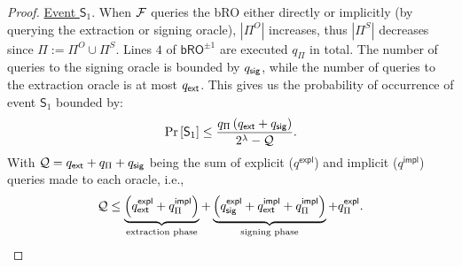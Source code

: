 \documentclass[version=submission, floatrow]{iacrcc}
\begin{document}
\begin{proof}
    \noindent\underline{Event $\mathsf{S}_{1}$}. When $\mathcal{F}$ queries the \textsf{bRO} either directly or implicitly (by querying the extraction or signing oracle), $|\Pi^{O}|$ increases, thus $|\Pi^{S}|$ decreases since $\Pi := \Pi^{O} \cup\Pi^{S}$. Lines $4$ of $\mathsf{bRO}^{\pm1}$ are executed $q_{\Pi}$ in total. The number of queries to the signing oracle is bounded by $q_{\mathsf{sig}}$, while the number of queries to the extraction oracle is at most $q_{\mathsf{ext}}$. This gives us the probability of occurrence of event $\mathsf{S}_{1}$ bounded by: 
    \begin{equation}\label{eq: event S1}
        \mathrm{Pr}\left[\mathsf{S}_{1}\right] \le \dfrac{q_{\Pi}\left(q_{\mathsf{ext}} + q_{\mathsf{sig}}\right)}{2^{\lambda} - \mathcal{Q}}.
    \end{equation}
    With $\mathcal{Q} = q_{\mathsf{ext}} + q_{\Pi} + q_{\mathsf{sig}}$ being the sum of explicit ($q^{\mathsf{expl}}$) and implicit ($q^{\mathsf{impl}}$) queries made to each oracle, i.e.,
    \begin{equation*}
        \mathcal{Q} \le \underbrace{\left(q_{\mathsf{ext}}^{\mathsf{expl}} + q_{\Pi}^{\mathsf{impl}}\right)}_{\text{extraction phase}} + \underbrace{\left(q_{\mathsf{sig}}^{\mathsf{expl}} + q_{\mathsf{ext}}^{\mathsf{impl}} + q_{\Pi}^{\mathsf{impl}}\right)}_{\text{signing phase}} + q_{\Pi}^{\mathsf{expl}}.
    \end{equation*}
    

\end{proof}
\end{document}
